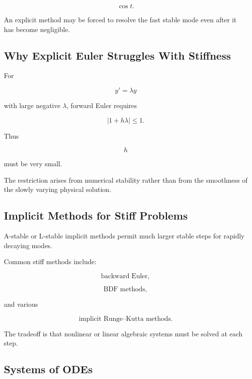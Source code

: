 \[
\cos t.
\]

An explicit method may be forced to resolve the fast stable mode even after
it has become negligible.

\subsection{Why Explicit Euler Struggles With Stiffness}
\label{subsec:euler-stiffness}

For

\[
y'=\lambda y
\]

with large negative \(\lambda\), forward Euler requires

\[
\boxed{
|1+h\lambda|\leq1.
}
\]

Thus

\[
h
\]

must be very small.

The restriction arises from numerical stability rather than from the
smoothness of the slowly varying physical solution.

\subsection{Implicit Methods for Stiff Problems}
\label{subsec:implicit-stiff-methods}

A-stable or L-stable implicit methods permit much larger stable steps for
rapidly decaying modes.

Common stiff methods include:

\[
\boxed{
\text{backward Euler},
}
\]

\[
\boxed{
\text{BDF methods},
}
\]

and various

\[
\boxed{
\text{implicit Runge--Kutta methods}.
}
\]

The tradeoff is that nonlinear or linear algebraic systems must be solved
at each step.

\subsection{Systems of ODEs}
\label{subsec:numerical-ode-systems}

